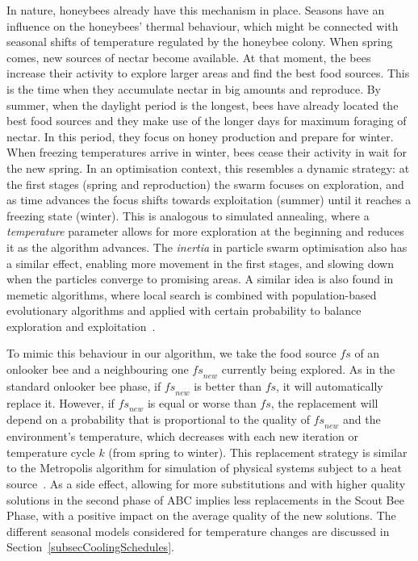 \documentclass[icae]{iosart2x}
\newcommand{\reviewed}[1]{#1} %
\begin{document}
In nature, honeybees already have this mechanism in place. Seasons have an influence on the honeybees' thermal behaviour, which might be connected with seasonal shifts of temperature regulated by the honeybee colony. When spring comes, new sources of nectar become available. At that moment, the bees increase their activity to explore larger areas and find the best food sources. This is the time when they accumulate nectar in big amounts and reproduce. By summer, when the daylight period is the longest, bees have already located the best food sources and they make use of the longer days for maximum foraging of nectar. In this period, they focus on honey production and prepare for winter. When freezing temperatures arrive in winter, bees cease their activity in wait for the new spring. In an optimisation context, this resembles a dynamic strategy: at the first stages (spring and reproduction) the swarm focuses on exploration, and as time advances the focus shifts towards exploitation (summer) until it reaches a freezing state (winter). \reviewed{This is analogous to simulated annealing, where a \textit{temperature} parameter allows for more exploration at the beginning and reduces it as the algorithm advances. The \textit{inertia} in particle swarm optimisation also has a similar effect, enabling more movement in the first stages, and slowing down when the particles converge to promising areas.  A similar idea is also found in memetic algorithms, where local search is combined with population-based evolutionary algorithms and applied with certain probability to balance exploration and exploitation~\cite{Siddique2016b,Gendreau2019}.}

To mimic this behaviour in our algorithm,  we take the food source $\mathit{fs}$ of an onlooker bee and a neighbouring one $\mathit{fs}_{new}$ currently being explored.  As in the standard onlooker bee phase, if $\mathit{fs}_{new}$ is better than $\mathit{fs}$, it will automatically replace it. However, if $\mathit{fs}_{new}$ is equal or worse than $\mathit{fs}$, the replacement will depend on a probability that is proportional to the quality of $\mathit{fs}_{new}$ and the environment's temperature, which decreases with each new iteration or temperature cycle ${k}$ (from spring to winter). This replacement strategy is similar to the Metropolis algorithm for simulation of physical systems subject to a heat source~\cite{Metropolis1953}. As a side effect, allowing for more substitutions and with higher quality solutions in the second phase of ABC implies less replacements in the Scout Bee Phase, with a positive impact on the average quality of the new solutions. \reviewed{The different seasonal models considered} for temperature changes are discussed in Section~\ref{subsecCoolingSchedules}.
\end{document}
